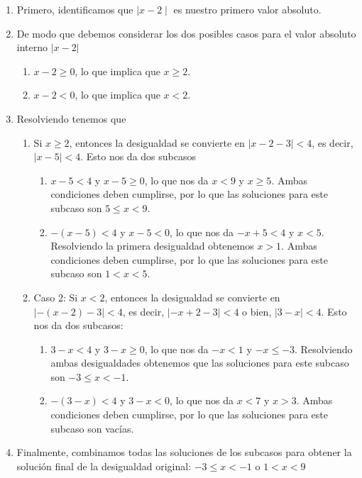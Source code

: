 \documentclass[a4paper,12pt]{article}
\begin{document}
\begin{enumerate}
	\item Primero, identificamos que $\mid x - 2 \mid$ es nuestro primero valor absoluto.
	\item De modo que debemos considerar los dos posibles casos para el valor absoluto interno $|x-2|$
		\begin{enumerate}
			\item $x-2 \ge 0$, lo que implica que $x \geq 2$.
			\item $x-2 < 0$, lo que implica que $x < 2$.
		\end{enumerate}
	\item Resolviendo tenemos que
		\begin{enumerate}
			\item Si $x \geq 2$, entonces la desigualdad se convierte en $|x - 2 - 3| < 4$, es decir, $|x - 5| < 4$. Esto nos da dos subcasos
				\begin{enumerate}
					\item $x - 5 < 4$ y $x - 5 \geq 0$, lo que nos da $x < 9$ y $x \geq 5$. Ambas condiciones deben cumplirse, por lo que las soluciones para este subcaso son $5 \leq x < 9$.
					\item $-(x - 5) < 4$ y $x - 5 < 0$, lo que nos da $-x + 5 < 4$ y $x < 5$. Resolviendo la primera desigualdad obtenemos $x > 1$. Ambas condiciones deben cumplirse, por lo que las soluciones para este subcaso son $1 < x < 5$.
				\end{enumerate}
			\item Caso 2: Si $x < 2$, entonces la desigualdad se convierte en $|- (x - 2) -3 | <4$, es decir, $|- x +2 -3 |<4$ o bien, $|3-x|<4$. Esto nos da dos subcasos:
			\begin{enumerate}
				\item $3-x<4$ y $3-x\geq0$, lo que nos da $-x<1$ y $-x\leq-3$. Resolviendo ambas desigualdades obtenemos que las soluciones para este subcaso son $-3\leq x< -1$.
				\item $-(3-x)<4$ y $3-x<0$, lo que nos da $x<7$ y $x>3$. Ambas condiciones deben cumplirse, por lo que las soluciones para este subcaso son vacías.
			\end{enumerate}
		\end{enumerate}

	\item Finalmente, combinamos todas las soluciones de los subcasos para obtener la solución final de la desigualdad original: $-3\leq x<-1$ o $1<x<9$
\end{enumerate}
\end{document}
